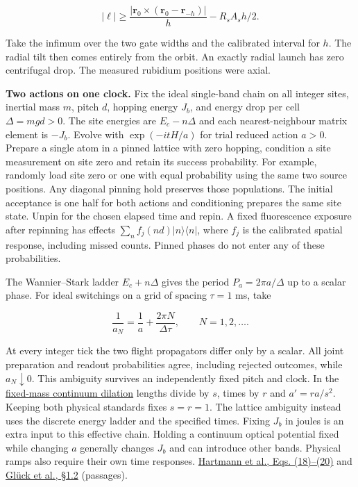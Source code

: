 \documentclass[11pt,a4paper]{article}
\begin{document}
\[
 |\ell|\ge
 \frac{|\mathbf r_0\times(\mathbf r_0-\mathbf r_{-h})|}{h}
 -R_s A_sh/2 .
\]

Take the infimum over the two gate widths and the calibrated interval
for \(h\). The radial tilt then comes entirely from the orbit. An
exactly radial launch has zero centrifugal drop. The measured rubidium
positions were axial.

\textbf{Two actions on one clock.} Fix the ideal single-band chain on
all integer sites, inertial mass \(m\), pitch \(d\), hopping energy
\(J_b\), and energy drop per cell \(\Delta=mgd>0\). The site energies
are \(E_c-n\Delta\) and each nearest-neighbour matrix element is
\(-J_b\). Evolve with \(\exp(-itH/a)\) for trial reduced action \(a>0\).
Prepare a single atom in a pinned lattice with zero hopping, condition a
site measurement on site zero and retain its success probability. For
example, randomly load site zero or one with equal probability using the
same two source positions. Any diagonal pinning hold preserves those
populations. The initial acceptance is one half for both actions and
conditioning prepares the same site state. Unpin for the chosen elapsed
time and repin. A fixed fluorescence exposure after repinning has
effects \(\sum_n f_j(nd)|n\rangle\langle n|\), where \(f_j\) is the
calibrated spatial response, including missed counts. Pinned phases do
not enter any of these probabilities.

The Wannier--Stark ladder \(E_c+n\Delta\) gives the period
\(P_a=2\pi a/\Delta\) up to a scalar phase. For ideal switchings on a
grid of spacing \(\tau=1\) ms, take

\[
                    \frac{1}{a_N}=\frac{1}{a}+\frac{2\pi N}{\Delta\tau},
                      \qquad N=1,2,\ldots .
\]

At every integer tick the two flight propagators differ only by a
scalar. All joint preparation and readout probabilities agree, including
rejected outcomes, while \(a_N\downarrow0\). This ambiguity survives an
independently fixed pitch and clock. In the
\href{groupoid-quantum-newton-states.md\#7-interacting-kernels-under-tangent-scaling}{fixed-mass
continuum dilation} lengths divide by \(s\), times by \(r\) and
\(a'=ra/s^2\). Keeping both physical standards fixes \(s=r=1\). The
lattice ambiguity instead uses the discrete energy ladder and the
specified times. Fixing \(J_b\) in joules is an extra input to this
effective chain. Holding a continuum optical potential fixed while
changing \(a\) generally changes \(J_b\) and can introduce other bands.
Physical ramps also require their own time responses.
\href{https://doi.org/10.1088/1367-2630/6/1/002}{Hartmann et al., Eqs.
(18)--(20)} and
\href{https://arxiv.org/pdf/quant-ph/0111132\#page=8}{Glück et al.,
§1.2} (passages).
\end{document}

